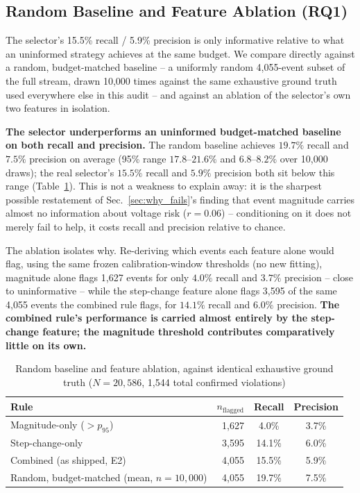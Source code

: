 \documentclass[11pt,conference]{IEEEtran}
\begin{document}
\subsection{Random Baseline and Feature Ablation (RQ1)}
\label{sec:baseline_ablation}
The selector's 15.5\% recall / 5.9\% precision is only informative relative to what an uninformed
strategy achieves at the same budget. We compare directly against a random, budget-matched baseline
-- a uniformly random 4,055-event subset of the full stream, drawn 10,000 times against the same
exhaustive ground truth used everywhere else in this audit -- and against an ablation of the
selector's own two features in isolation.

\textbf{The selector underperforms an uninformed budget-matched baseline on both recall and
precision.} The random baseline achieves $19.7\%$ recall and $7.5\%$ precision on average (95\%
range $17.8$--$21.6\%$ and $6.8$--$8.2\%$ over 10,000 draws); the real selector's $15.5\%$ recall and
$5.9\%$ precision both sit below this range (Table~\ref{tab:baseline_ablation}). This is not a
weakness to explain away: it is the sharpest possible restatement of Sec.~\ref{sec:why_fails}'s
finding that event magnitude carries almost no information about voltage risk ($r=0.06$) --
conditioning on it does not merely fail to help, it costs recall and precision relative to chance.

The ablation isolates why. Re-deriving which events each feature alone would flag, using the same
frozen calibration-window thresholds (no new fitting), magnitude alone flags 1,627 events for only
$4.0\%$ recall and $3.7\%$ precision -- close to uninformative -- while the step-change feature alone
flags 3,595 of the same 4,055 events the combined rule flags, for $14.1\%$ recall and $6.0\%$
precision. \textbf{The combined rule's performance is carried almost entirely by the step-change
feature; the magnitude threshold contributes comparatively little on its own.}

\begin{table}[htbp]
\caption{Random baseline and feature ablation, against identical exhaustive ground truth ($N=20{,}586$, 1,544 total confirmed violations)}
\label{tab:baseline_ablation}
\centering
\footnotesize
\setlength{\tabcolsep}{3pt}
\begin{tabular}{@{}lrcc@{}}
\toprule
\textbf{Rule} & \textbf{$n_{\mathrm{flagged}}$} & \textbf{Recall} & \textbf{Precision} \\ \midrule
Magnitude-only ($>p_{95}$) & 1,627 & 4.0\% & 3.7\% \\
Step-change-only & 3,595 & 14.1\% & 6.0\% \\
Combined (as shipped, E2) & 4,055 & 15.5\% & 5.9\% \\
Random, budget-matched (mean, $n{=}10{,}000$) & 4,055 & 19.7\% & 7.5\% \\ \bottomrule
\end{tabular}
\end{table}
\end{document}
